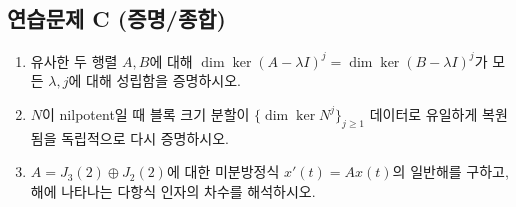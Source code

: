 \subsection*{연습문제 C (증명/종합)}
\begin{enumerate}[label=\textbf{C\arabic*.}]
\item 유사한 두 행렬 $A,B$에 대해 $\dim\ker(A-\lambda I)^j=\dim\ker(B-\lambda I)^j$가 모든 $\lambda,j$에 대해 성립함을 증명하시오.
\item $N$이 nilpotent일 때 블록 크기 분할이 $\{\dim\ker N^j\}_{j\ge1}$ 데이터로 유일하게 복원됨을 독립적으로 다시 증명하시오.
\item $A=J_3(2)\oplus J_2(2)$에 대한 미분방정식 $x'(t)=Ax(t)$의 일반해를 구하고, 해에 나타나는 다항식 인자의 차수를 해석하시오.
\end{enumerate}